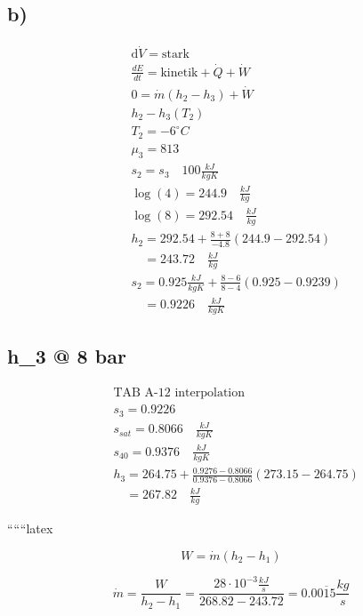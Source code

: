

\subsection*{b)}
\begin{align*}
    &\text{d} \dot{V} = \text{stark} \\
    &\frac{dE}{dt} = \text{kinetik} + \dot{Q} + \dot{W} \\
    &0 = \dot{m}(h_2 - h_3) + \dot{W} \\
    &h_2 - h_3(T_2) \\
    &T_2 = -6^\circ C \\
    &\mu_3 = 813 \\
    &s_2 = s_3 \quad 100 \frac{kJ}{kgK} \\
    &\log(4) = 244.9 \quad \frac{kJ}{kg} \\
    &\log(8) = 292.54 \quad \frac{kJ}{kg} \\
    &h_2 = 292.54 + \frac{8 + 8}{-4.8} (244.9 - 292.54) \\
    &\quad = 243.72 \quad \frac{kJ}{kg} \\
    &s_2 = 0.925 \frac{kJ}{kgK} + \frac{8 - 6}{8 - 4} (0.925 - 0.9239) \\
    &\quad = 0.9226 \quad \frac{kJ}{kgK}
\end{align*}

\subsection*{h_3 @ 8 bar}
\begin{align*}
    &\text{TAB A-12 interpolation} \\
    &s_3 = 0.9226 \\
    &s_{sat} = 0.8066 \quad \frac{kJ}{kgK} \\
    &s_{40} = 0.9376 \quad \frac{kJ}{kgK} \\
    &h_3 = 264.75 + \frac{0.9276 - 0.8066}{0.9376 - 0.8066} (273.15 - 264.75) \\
    &\quad = 267.82 \quad \frac{kJ}{kg}
\end{align*}

``````latex


\[
W = \dot{m} (h_2 - h_1)
\]

\[
\dot{m} = \frac{W}{h_2 - h_1} = \frac{28 \cdot 10^{-3} \frac{kJ}{s}}{268.82 - 243.72} = 0.00 \overline{1}5 \frac{kg}{s}
\]